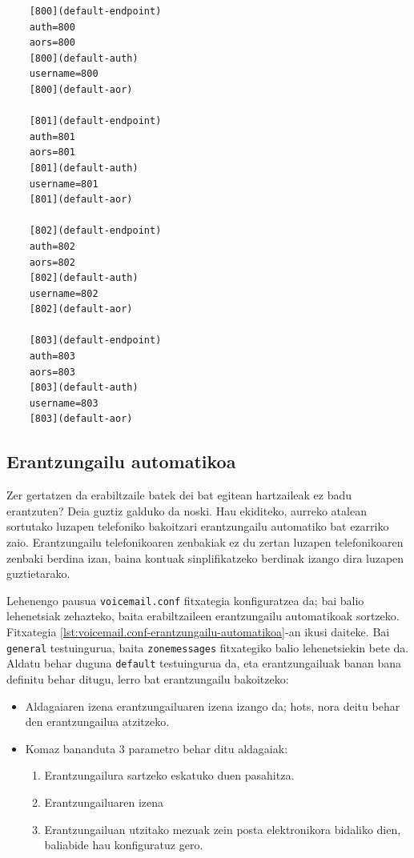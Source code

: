 \begin{listing}
    \begin{verbatim}
    [800](default-endpoint)
    auth=800
    aors=800
    [800](default-auth)
    username=800
    [800](default-aor)
    
    [801](default-endpoint)
    auth=801
    aors=801
    [801](default-auth)
    username=801
    [801](default-aor)
    
    [802](default-endpoint)
    auth=802
    aors=802
    [802](default-auth)
    username=802
    [802](default-aor)
    
    [803](default-endpoint)
    auth=803
    aors=803
    [803](default-auth)
    username=803
    [803](default-aor)
    \end{verbatim}
    \caption{Luzapen telefonikoen konfigurazioa deientzako pjsip.conf konfigurazio fitxategian}
    \label{lst:pjsip.conf-luzapen-deiak}
\end{listing}

\subsection{Erantzungailu automatikoa}

Zer gertatzen da erabiltzaile batek dei bat egitean hartzaileak ez badu erantzuten? Deia guztiz galduko da noski. Hau ekiditeko, aurreko atalean sortutako luzapen telefoniko bakoitzari erantzungailu automatiko bat ezarriko zaio. Erantzungailu telefonikoaren zenbakiak ez du zertan luzapen telefonikoaren zenbaki berdina izan, baina kontuak sinplifikatzeko berdinak izango dira luzapen guztietarako.

Lehenengo pausua \texttt{voicemail.conf} fitxategia konfiguratzea da; bai balio lehenetsiak zehazteko, baita erabiltzaileen erantzungailu automatikoak sortzeko. Fitxategia \autoref{lst:voicemail.conf-erantzungailu-automatikoa}-an ikusi daiteke. Bai \texttt{general} testuingurua, baita \texttt{zonemessages} fitxategiko balio lehenetsiekin bete da. Aldatu behar duguna \texttt{default} testuingurua da, eta erantzungailuak banan bana definitu behar ditugu, lerro bat erantzungailu bakoitzeko:
\begin{itemize}
    \item Aldagaiaren izena erantzungailuaren izena izango da; hots, nora deitu behar den erantzungailua atzitzeko.
    \item Komaz bananduta 3 parametro behar ditu aldagaiak:
    \begin{enumerate}
        \item Erantzungailura sartzeko eskatuko duen pasahitza.
        \item Erantzungailuaren izena
        \item Erantzungailuan utzitako mezuak zein posta elektronikora bidaliko dien, baliabide hau konfiguratuz gero.
    \end{enumerate}
\end{itemize}

